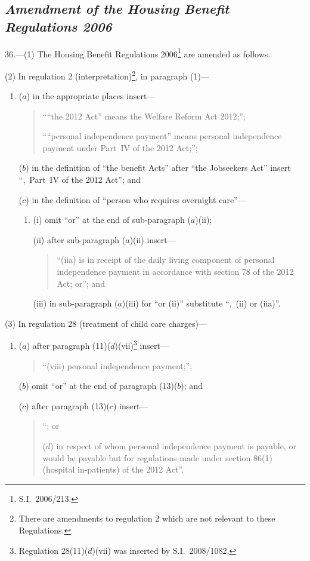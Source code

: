 \documentclass[12pt,a4paper]{article}
\begin{document}
\subsection*{\itshape Amendment of the Housing Benefit Regulations 2006}

36.—(1) The Housing Benefit Regulations 2006\footnote{S.I.~2006/213.} are amended as follows.

(2) In regulation 2 (interpretation)\footnote{There are amendments to regulation 2 which are not relevant to these Regulations.}, in paragraph (1)—
\begin{enumerate}\item[]
($a$) in the appropriate places insert—
\begin{quotation}
““the 2012 Act” means the Welfare Reform Act 2012;”;

““personal independence payment” means personal independence payment under Part~IV of the 2012 Act;”;
\end{quotation}

($b$) in the definition of “the benefit Acts” after “the Jobseekers Act” insert “,~Part~IV of the 2012 Act”; and

($c$) in the definition of “person who requires overnight care”—
\begin{enumerate}\item[]
(i) omit “or” at the end of sub-paragraph ($a$)(ii);

(ii) after sub-paragraph ($a$)(ii)  insert—
\begin{quotation}
“(iia) is in receipt of the daily living component of personal independence payment in accordance with section 78 of the 2012 Act; or”; and
\end{quotation}

(iii) in sub-paragraph ($a$)(iii)  for “or (ii)” substitute “,~(ii)  or (iia)”.
\end{enumerate}
\end{enumerate}

(3) In regulation 28 (treatment of child care charges)—
\begin{enumerate}\item[]
($a$) after paragraph (11)($d$)(vii)\footnote{Regulation 28(11)($d$)(vii)  was inserted by S.I.~2008/1082.} insert—
\begin{quotation}
“(viii) personal independence payment;”;
\end{quotation}

($b$) omit “or” at the end of paragraph (13)($b$); and

($c$) after paragraph (13)($c$)  insert—
\begin{quotation}
“; or

($d$) in respect of whom personal independence payment is payable, or would be payable but for regulations made under section 86(1) (hospital in-patients) of the 2012 Act”.
\end{quotation}
\end{enumerate}
\end{document}
